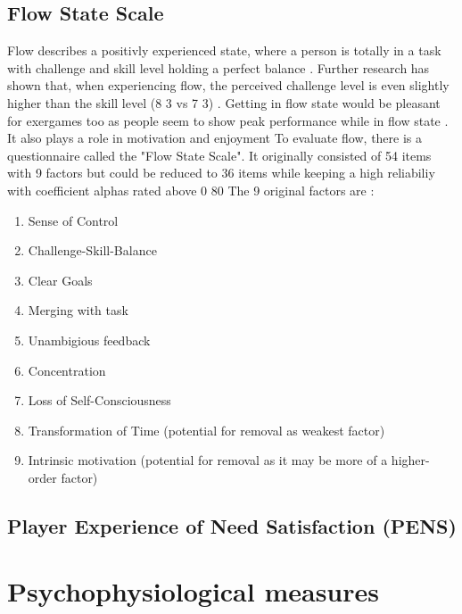 \subsection{Flow State Scale}
Flow describes a positivly experienced state, where a person is totally in a task with challenge and skill level holding a perfect balance \cite{jackson1998psychological}. Further research has shown that, when experiencing flow, the perceived challenge level is even slightly higher than the skill level (8 3 vs 7 3) \cite{jackson1996development}. Getting in flow state would be pleasant for exergames too as people seem to show peak performance while in flow state \cite{jackson1996development}. It also plays a role in motivation and enjoyment \cite{jackson1996development} 
To evaluate flow, there is a questionnaire called the "Flow State Scale". It originally consisted of 54 items with 9 factors but could be reduced to 36 items while keeping a high reliabiliy with coefficient alphas rated above 0 80 \cite{jackson1996development} 
The 9 original factors are \cite{jackson1996development}:
\begin{enumerate}
	\item Sense of Control
	\item Challenge-Skill-Balance
	\item Clear Goals
	\item Merging with task
	\item Unambigious feedback
	\item Concentration
	\item Loss of Self-Consciousness
	\item Transformation of Time (potential for removal as weakest factor)
	\item Intrinsic motivation (potential for removal as it may be more of a higher-order factor)
\end{enumerate}

\subsection{Player Experience of Need Satisfaction (PENS)}


\section{Psychophysiological measures}

